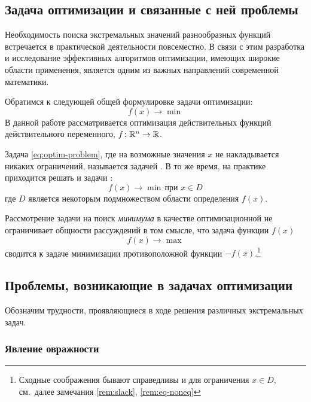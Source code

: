 \subsection{Задача оптимизации и связанные с ней проблемы}

Необходимость поиска экстремальных значений разнообразных функций
встречается в практической деятельности повсеместно. В связи с этим
разработка и исследование эффективных алгоритмов оптимизации, имеющих
широкие области применения, является одним из важных направлений
современной математики.

Обратимся к следующей общей формулировке задачи оптимизации:
\begin{equation}
  \label{eq:optim-problem}
  f(x) \to \min
\end{equation}
В данной работе рассматривается оптимизация действительных функций
действительного переменного, $f\colon \mathbb{R}^n \to \mathbb{R}$.

Задача \eqref{eq:optim-problem}, где на возможные значения $x$ не
накладывается никаких ограничений, называется задачей
. В то же время, на практике
приходится решать и задачи :
\begin{equation}
  \label{eq:optim-problem-c}
  f(x) \to \min\, \text{при } x \in D
\end{equation}
где $D$ является некоторым подмножеством области определения $f(x)$.

\begin{rem}
  Рассмотрение задачи на поиск \emph{минимума} в качестве
  оптимизационной не ограничивает общности рассуждений в том смысле,
  что задача  функции $f(x)$
  \begin{equation*}
    f(x) \to \max
  \end{equation*}
  сводится к задаче минимизации противоположной функции
  $-f(x)$.\footnote[1]{Сходные соображения бывают справедливы и для
    ограничения \mbox{$x \in D$}, см. далее замечания \ref{rem:slack},
    \ref{rem:eq-noneq}}
\end{rem}
\subsection{Проблемы, возникающие в задачах оптимизации}
Обозначим трудности, проявляющиеся в ходе решения различных
экстремальных задач.

\subsubsection{Явление овражности}
\label{sec:problems-ill}

